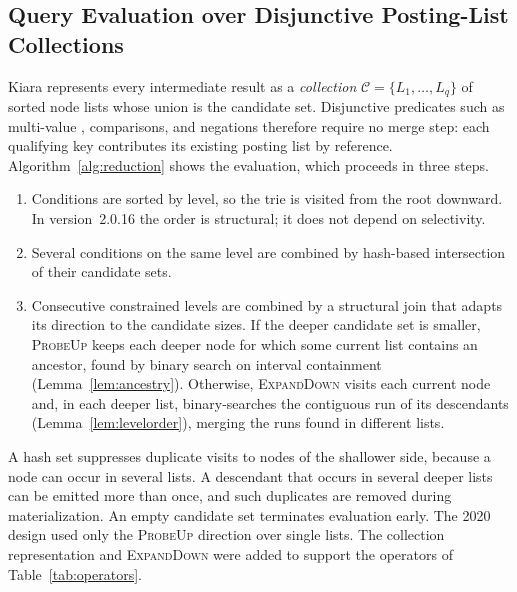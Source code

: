\subsection{Query Evaluation over Disjunctive Posting-List Collections}
\label{sec:reduction}
Kiara represents every intermediate result as a \emph{collection} $\mathcal{C}=\{L_1,\dots,L_q\}$ of sorted node lists whose union is the candidate set. Disjunctive predicates such as multi-value , comparisons, and negations therefore require no merge step: each qualifying key contributes its existing posting list by reference. Algorithm~\ref{alg:reduction} shows the evaluation, which proceeds in three steps.
\begin{enumerate}
\item Conditions are sorted by level, so the trie is visited from the root downward. In version~2.0.16 the order is structural; it does not depend on selectivity.
\item Several conditions on the same level are combined by hash-based intersection of their candidate sets.
\item Consecutive constrained levels are combined by a structural join that adapts its direction to the candidate sizes. If the deeper candidate set is smaller, \textsc{ProbeUp} keeps each deeper node for which some current list contains an ancestor, found by binary search on interval containment (Lemma~\ref{lem:ancestry}). Otherwise, \textsc{ExpandDown} visits each current node and, in each deeper list, binary-searches the contiguous run of its descendants (Lemma~\ref{lem:levelorder}), merging the runs found in different lists.
\end{enumerate}
A hash set suppresses duplicate visits to nodes of the shallower side, because a node can occur in several lists. A descendant that occurs in several deeper lists can be emitted more than once, and such duplicates are removed during materialization. An empty candidate set terminates evaluation early. The 2020 design used only the \textsc{ProbeUp} direction over single lists. The collection representation and \textsc{ExpandDown} were added to support the operators of Table~\ref{tab:operators}.

